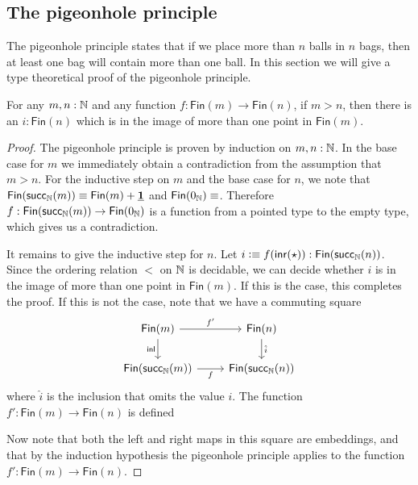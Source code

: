 \subsection{The pigeonhole principle}

The pigeonhole principle states that if we place more than $n$ balls in $n$ bags, then at least one bag will contain more than one ball. In this section we will give a type theoretical proof of the pigeonhole principle.

\begin{thm}\label{thm:pigeonhole}
  For any $m,n:{\mathbb{N}}$ and any function $f:\mathsf{Fin}(m)\to\mathsf{Fin}(n)$, if $m>n$, then there is an $i:\mathsf{Fin}(n)$ which is in the image of more than one point in $\mathsf{Fin}(m)$.
\end{thm}

\begin{proof}
  The pigeonhole principle is proven by induction on $m,n:{\mathbb{N}}$. In the base case for $m$ we immediately obtain a contradiction from the assumption that $m>n$. For the inductive step on $m$ and the base case for $n$, we note that $\mathsf{Fin}(\mathsf{succ}_{{\mathbb{N}}}(m))\equiv \mathsf{Fin}(m)+\underline{\mathbf{1}}$ and $\mathsf{Fin}(\zeroN)\jdeq \empty$. Therefore $f:\mathsf{Fin}(\mathsf{succ}_{{\mathbb{N}}}(m))\to\mathsf{Fin}(0_{{\mathbb{N}}})$ is a function from a pointed type to the empty type, which gives us a contradiction.

  It remains to give the inductive step for $n$. Let $i\vcentcolon\equiv f({\mathsf{inr}}(\star)):\mathsf{Fin}(\mathsf{succ}_{{\mathbb{N}}}(n))$. Since the ordering relation $<$ on ${\mathbb{N}}$ is decidable, we can decide whether $i$ is in the image of more than one point in $\mathsf{Fin}(m)$. If this is the case, this completes the proof. If this is not the case, note that we have a commuting square
  \begin{equation*}
    \begin{tikzcd}
      \mathsf{Fin}(m) \arrow[r,"{f'}"] \arrow[d,swap,"\inl"] & \mathsf{Fin}(n) \arrow[d,"{\hat{i}}"] \\
      \mathsf{Fin}(\succN(m)) \arrow[r,swap,"f"] & \mathsf{Fin}(\succN(n))
    \end{tikzcd}
  \end{equation*}
  where $\hat{i}$ is the inclusion that omits the value $i$. The function $f':\mathsf{Fin}(m)\to\mathsf{Fin}(n)$ is defined 

  Now note that both the left and right maps in this square are embeddings, and that by the induction hypothesis the pigeonhole principle applies to the function $f':\mathsf{Fin}(m)\to\mathsf{Fin}(n)$. 
\end{proof}

